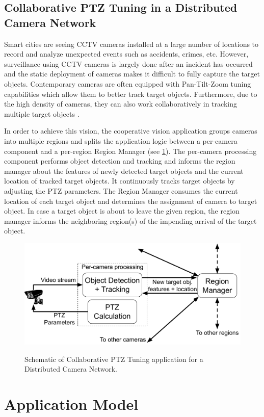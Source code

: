 \subsection{Collaborative PTZ Tuning in a Distributed Camera Network}
Smart cities are seeing CCTV cameras installed at a large number of locations to record and analyze unexpected events such as accidents, crimes, etc. However, surveillance using CCTV cameras is largely done after an incident has occurred and the static deployment of cameras makes it difficult to fully capture the target objects. Contemporary cameras are often equipped with Pan-Tilt-Zoom tuning capabilities which allow them to better track target objects. Furthermore, due to the high density of cameras, they can also work collaboratively in tracking multiple target objects \cite{matsuyama2002real}.
\par In order to achieve this vision, the cooperative vision application groups cameras into multiple regions and splits the application logic between a per-camera component and a per-region Region Manager (see \cref{fig:multi_cam_ptz_app}). The per-camera processing component performs object detection and tracking and informs the region manager about the features of newly detected target objects and the current location of tracked target objects. It continuously tracks target objects by adjusting the PTZ parameters. The Region Manager consumes the current location of each target object and determines the assignment of camera to target object. In case a target object is about to leave the given region, the region manager informs the neighboring region(s) of the impending arrival of the target object.

\begin{figure}[h]
\centering
\includegraphics[width=0.75\columnwidth]{figures/apps/multi_cam_ptz}
\label{fig:multi_cam_ptz_app}
\caption{Schematic of Collaborative PTZ Tuning application for a Distributed Camera Network.}
\end{figure}

\section{Application Model}
